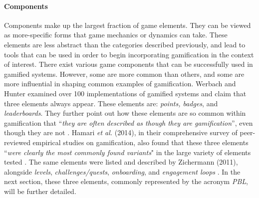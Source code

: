 \paragraph{Components}
Components make up the largest fraction of game elements. They can be viewed as more-specific forms that game mechanics or dynamics can take. These elements are less abstract than the categories described previously, and lead to tools that can be used in order to begin incorporating gamification in the context of interest. There exist various game components that can be successfully used in gamified systems. However, some are more common than others, and some are more influential in shaping common examples of gamification. Werbach and Hunter examined over 100 implementations of gamified systems and claim that three elements always appear. These elements are: \textit{points, badges}, and \textit{leaderboards}. They further point out how these elements are so common within gamification that ``\textit{they are often described as though they are gamification}'', even though they are not \cite{werbach2012win}.  Hamari \textit{et al.} (2014), in their comprehensive survey of peer-reviewed empirical studies on gamification, also found that these three elements ``\textit{were clearly the most commonly found variants}" in the large variety of elements tested \cite{hamari2014does}. The same elements were listed and described by Zichermann (2011), alongside \textit{levels}, \textit{challenges/quests}, \textit{onboarding}, and \textit{engagement loops} \cite{zichermann2011gamification}. In the next section, these three elements, commonly represented by the acronym \textit{PBL}, will be further detailed.
